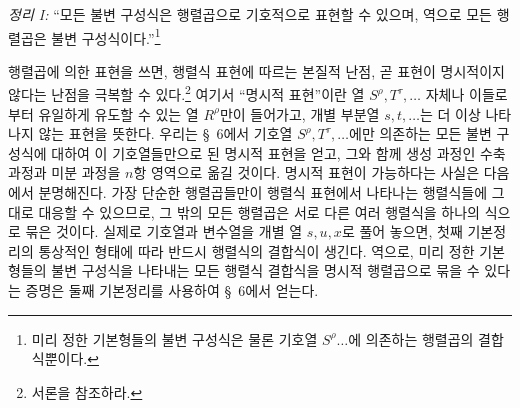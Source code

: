 \emph{정리 I:} ``모든 불변 구성식은 행렬곱으로 기호적으로 표현할 수 있으며, 역으로 모든 행렬곱은 불변 구성식이다.''\footnote{미리 정한 기본형들의 불변 구성식은 물론 기호열 $S^\rho\ldots$에 의존하는 행렬곱의 결합식뿐이다.}

행렬곱에 의한 표현을 쓰면, 행렬식 표현에 따르는 본질적 난점, 곧 표현이 명시적이지 않다는 난점을 극복할 수 있다.\footnote{서론을 참조하라.} 여기서 ``명시적 표현''이란 열 $S^\rho,T^\tau,\ldots$ 자체나 이들로부터 유일하게 유도할 수 있는 열 $R^\rho$만이 들어가고, 개별 부분열 $s,t,\ldots$는 더 이상 나타나지 않는 표현을 뜻한다. 우리는 \S\ 6에서 기호열 $S^\rho,T^\tau,\ldots$에만 의존하는 모든 불변 구성식에 대하여 이 기호열들만으로 된 명시적 표현을 얻고, 그와 함께 생성 과정인 수축 과정과 미분 과정을 $n$항 영역으로 옮길 것이다. 명시적 표현이 가능하다는 사실은 다음에서 분명해진다. 가장 단순한 행렬곱들만이 행렬식 표현에서 나타나는 행렬식들에 그대로 대응할 수 있으므로, 그 밖의 모든 행렬곱은 서로 다른 여러 행렬식을 하나의 식으로 묶은 것이다. 실제로 기호열과 변수열을 개별 열 $s,u,x$로 풀어 놓으면, 첫째 기본정리의 통상적인 형태에 따라 반드시 행렬식의 결합식이 생긴다. 역으로, 미리 정한 기본형들의 불변 구성식을 나타내는 모든 행렬식 결합식을 명시적 행렬곱으로 묶을 수 있다는 증명은 둘째 기본정리를 사용하여 \S\ 6에서 얻는다.

